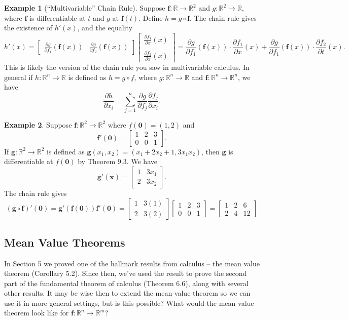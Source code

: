 \documentclass{article}
\newcommand{\R}{\mathbb{R}}
\newcommand{\x}{\mathbf{x}}
\newcommand{\f}{\mathbf{f}}
\newcommand{\ze}{\mathbf{0}}
\theoremstyle{definition}
\newtheorem{example}{Example}[section]
\begin{document}
\begin{example}[``Multivariable'' Chain Rule]
	Suppose $ \f:\R\to\R^2 $ and $ g:\R^2\to\R $, where $ \f $ is differentiable at $ t $ and $ g $ at $ \f(t) $. Define $ h=g\circ\f $. The chain rule gives the existence of $h'(x) $, and the equality
		$$ h'(x) =  \begin{bmatrix}
		\frac{\partial g}{\partial f_1}(\f(x)) & \frac{\partial g}{\partial f_2}(\f(x))
	\end{bmatrix}\begin{bmatrix}
	\frac{\partial f_1}{\partial x}(x)\\\\ \frac{\partial f_2}{\partial x}(x)
\end{bmatrix} = \frac{\partial g}{\partial f_1}(\f(x))\cdot 	\frac{\partial f_1}{\partial x}(x) + \frac{\partial g}{\partial f_1}(\f(x))\cdot 	\frac{\partial f_2}{\partial t}(x).$$
This is likely the version of the chain rule you saw in multivariable calculus. In general if $ h:\R^n\to \R $ is defined as $ h=g\circ f $, where $ g:\R^n\to\R $ and $ \f:\R^n\to\R^n $, 
we have $$ \frac{\partial h}{\partial x_i}= \sum_{j=1}^n\frac{\partial g}{\partial f_j}\frac{\partial f_j}{\partial x_i} .$$
\end{example}
\begin{example}
	Suppose $ \f:\R^2\to \R^2 $ where $ f(\ze)=(1,2) $ and $$ \f'(\ze) = \begin{bmatrix}
		1&2&3\\0&0&1
	\end{bmatrix}.$$
If $ \mathbf g:\R^2\to\R^2 $ is defined as $ \mathbf g(x_1,x_2)= (x_1+2x_2+1,3x_1x_2) $, then $ \mathbf g $ is differentiable at $ f(\ze) $ by Theorem 9.3. We have 
$$ \mathbf g'(\x) = \begin{bmatrix}
	1 & 3x_1\\2 & 3x_2
\end{bmatrix}.$$
The chain rule gives 
$$ (\mathbf g\circ \mathbf f)'(\ze) = \mathbf g'(\f(\ze))\f'(\ze) = \begin{bmatrix}
	1 & 3(1)\\2 & 3(2)
\end{bmatrix}\begin{bmatrix}
1&2&3\\0&0&1
\end{bmatrix} = \begin{bmatrix}
1&2&6\\2&4&12
\end{bmatrix} $$
\end{example}
\subsection{Mean Value Theorems}
In Section 5 we proved one of the hallmark results from calculus -- the mean value theorem (Corollary 5.2). Since then, we've used the result to prove the second part of the fundamental theorem of calculus (Theorem 6.6), along with several other results. It may be wise then to extend the mean value theorem so we can use it in more general settings, but is this possible? What would the mean value theorem look like for $ \f:\R^n\to \R^m $? 
\end{document}
